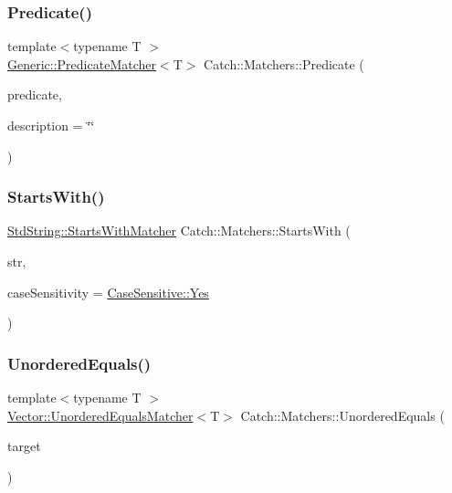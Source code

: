 \subsubsection{\texorpdfstring{Predicate()}{Predicate()}}
{\footnotesize\ttfamily template$<$typename T $>$ \\
\mbox{\hyperlink{class_catch_1_1_matchers_1_1_generic_1_1_predicate_matcher}{Generic\+::\+Predicate\+Matcher}}$<$T$>$ Catch\+::\+Matchers\+::\+Predicate (\begin{DoxyParamCaption}\item[{std\+::function$<$ bool(T const \&)$>$ const \&}]{predicate,  }\item[{std\+::string const \&}]{description = {\ttfamily \char`\"{}\char`\"{}} }\end{DoxyParamCaption})}

\mbox{\label{namespace_catch_1_1_matchers_a97c9ee09a70378ca7e8c6f9f01b0d6d1}} 
\subsubsection{\texorpdfstring{Starts\+With()}{StartsWith()}}
{\footnotesize\ttfamily \mbox{\hyperlink{struct_catch_1_1_matchers_1_1_std_string_1_1_starts_with_matcher}{Std\+String\+::\+Starts\+With\+Matcher}} Catch\+::\+Matchers\+::\+Starts\+With (\begin{DoxyParamCaption}\item[{std\+::string const \&}]{str,  }\item[{\mbox{\hyperlink{struct_catch_1_1_case_sensitive_aad49d3aee2d97066642fffa919685c6a}{Case\+Sensitive\+::\+Choice}}}]{case\+Sensitivity = {\ttfamily \mbox{\hyperlink{struct_catch_1_1_case_sensitive_aad49d3aee2d97066642fffa919685c6aa7c5550b69ec3c502e6f609b67f9613c6}{Case\+Sensitive\+::\+Yes}}} }\end{DoxyParamCaption})}

\mbox{\label{namespace_catch_1_1_matchers_a3eced3a4f580478f4c5e67ed7e2915df}} 
\subsubsection{\texorpdfstring{Unordered\+Equals()}{UnorderedEquals()}}
{\footnotesize\ttfamily template$<$typename T $>$ \\
\mbox{\hyperlink{struct_catch_1_1_matchers_1_1_vector_1_1_unordered_equals_matcher}{Vector\+::\+Unordered\+Equals\+Matcher}}$<$T$>$ Catch\+::\+Matchers\+::\+Unordered\+Equals (\begin{DoxyParamCaption}\item[{std\+::vector$<$ T $>$ const \&}]{target }\end{DoxyParamCaption})}

